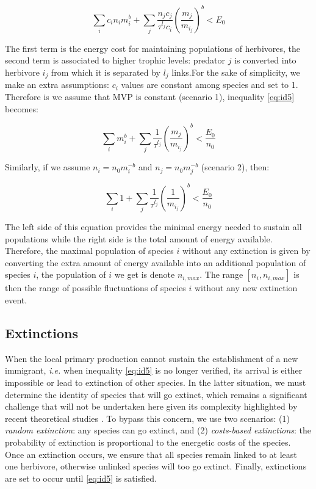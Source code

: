 \begin{equation} \sum_i c_in_im_i^b + \sum_j \frac{n_jc_j}{\tau^{l_j} c_i} \left( \frac{m_j}{m_{i_j}} \right)^b < E_0 \label{eq:id5}\end{equation}

The first term is the energy cost for maintaining populations of
herbivores, the second term is associated to higher trophic levels:
predator \(j\) is converted into herbivore \(i_j\) from which it is
separated by \(l_j\) links.For the sake of simplicity, we make an extra
assumptions: \(c_i\) values are constant among species and set to 1.
Therefore is we assume that MVP is constant (scenario 1), inequality
\ref{eq:id5} becomes:

\begin{equation} \sum_i m_i^b + \sum_j \frac{1}{\tau^{l_j}} \left( \frac{m_j}{m_{i_j}} \right)^b< \frac{E_0}{n_0} \label{eq:id5a}\end{equation}

Similarly, if we assume \(n_i=n_0m_i^{-b}\) and \(n_j=n_0m_j^{-b}\)
(scenario 2), then:

\begin{equation} \sum_i 1 + \sum_j \frac{1}{\tau^{l_j}} \left( \frac{1}{m_{i_j}} \right)^b< \frac{E_0}{n_0} \label{eq:id5b}\end{equation}

The left side of this equation provides the minimal energy needed to
sustain all populations while the right side is the total amount of
energy available. Therefore, the maximal population of species \(i\)
without any extinction is given by converting the extra amount of energy
available into an additional population of species \(i\), the population
of \(i\) we get is denote \(n_{i,max}\). The range \([n_i, n_{i, max}]\)
is then the range of possible fluctuations of species \(i\) without any
new extinction event.

\subsection{Extinctions}\label{extinctions}

When the local primary production cannot sustain the establishment of a
new immigrant, \emph{i.e.} when inequality \ref{eq:id5} is no longer
verified, its arrival is either impossible or lead to extinction of
other species. In the latter situation, we must determine the identity
of species that will go extinct, which remains a significant challenge
that will not be undertaken here given its complexity highlighted by
recent theoretical studies \citep{Saterberg2013, Zhao2016}. To bypass
this concern, we use two scenarios: (1) \emph{random extinction}: any
species can go extinct, and (2) \emph{costs-based extinctions}: the
probability of extinction is proportional to the energetic costs of the
species. Once an extinction occurs, we ensure that all species remain
linked to at least one herbivore, otherwise unlinked species will too go
extinct. Finally, extinctions are set to occur until \ref{eq:id5} is
satisfied.

